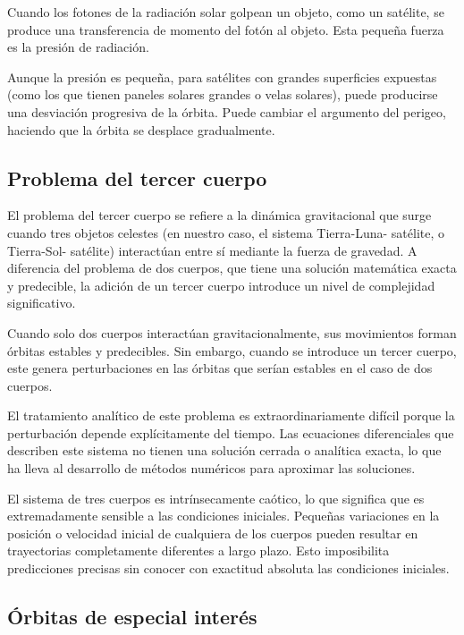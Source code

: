 Cuando los fotones de la radiación solar golpean un objeto, como un satélite, se produce una transferencia de momento del fotón al objeto. Esta pequeña fuerza es la presión de radiación.

Aunque la presión es pequeña, para satélites con grandes superficies expuestas (como los que tienen paneles solares grandes o velas solares), puede producirse una desviación progresiva de la órbita. Puede cambiar el argumento del perigeo, haciendo que la órbita se desplace gradualmente.


\subsection{Problema del tercer cuerpo}

El problema del tercer cuerpo se refiere a la dinámica gravitacional que surge cuando tres objetos celestes (en nuestro caso, el sistema Tierra-Luna- satélite, o Tierra-Sol- satélite) interactúan entre sí mediante la fuerza de gravedad. A diferencia del problema de dos cuerpos, que tiene una solución matemática exacta y predecible, la adición de un tercer cuerpo introduce un nivel de complejidad significativo.

Cuando solo dos cuerpos interactúan gravitacionalmente, sus movimientos forman órbitas estables y predecibles. Sin embargo, cuando se introduce un tercer cuerpo, este genera perturbaciones en las órbitas que serían estables en el caso de dos cuerpos.

El tratamiento analítico de este problema es extraordinariamente difícil porque la perturbación depende explícitamente del tiempo. Las ecuaciones diferenciales que describen este sistema no tienen una solución cerrada o analítica exacta, lo que ha lleva al desarrollo de métodos numéricos para aproximar las soluciones.

El sistema de tres cuerpos es intrínsecamente caótico, lo que significa que es extremadamente sensible a las condiciones iniciales. Pequeñas variaciones en la posición o velocidad inicial de cualquiera de los cuerpos pueden resultar en trayectorias completamente diferentes a largo plazo. Esto imposibilita predicciones precisas sin conocer con exactitud absoluta las condiciones iniciales.\\

\subsection{Órbitas de especial interés}

